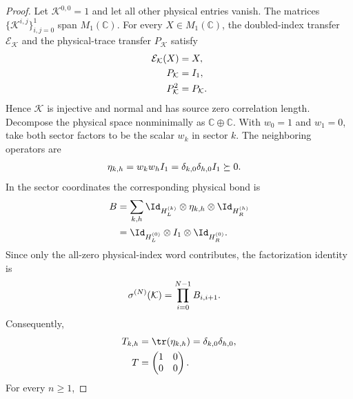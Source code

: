 \begin{proof}\leanok
    Let $\mathcal K^{0,0}=1$ and let all other physical entries vanish. The
    matrices $\{\mathcal K^{i,j}\}_{i,j=0}^1$ span $M_1(\mathbb C)$. For every
    $X\in M_1(\mathbb C)$, the doubled-index transfer $\mathcal E_{\mathcal K}$
    and the physical-trace transfer $P_{\mathcal K}$ satisfy
    \begin{align}
        \mathcal E_{\mathcal K}(X) & =X,
        \notag                                        \\
        P_{\mathcal K}             & =I_1,
        \notag                                        \\
        P_{\mathcal K}^2           & =P_{\mathcal K}.
        \notag
    \end{align}
    Hence $\mathcal K$ is injective and normal and has source zero correlation
    length. Decompose the physical space nonminimally as
    $\mathbb C\oplus\mathbb C$. With $w_0=1$ and $w_1=0$, take both sector
    factors to be the scalar $w_k$ in sector $k$. The neighboring operators
    are
    \begin{align}
        \eta_{k,h}
         & =w_kw_h I_1
        =\delta_{k,0}\delta_{h,0}I_1
        \succeq0.
        \notag
    \end{align}
    In the sector coordinates the corresponding physical bond is
    \begin{align}
        B
         & =\sum_{k,h}\Id_{H_L^{(k)}}\otimes\eta_{k,h}\otimes
        \Id_{H_R^{(h)}}
        \notag                                                \\
         & =\Id_{H_L^{(0)}}\otimes I_1\otimes\Id_{H_R^{(0)}}.
        \notag
    \end{align}
    Since only the all-zero physical-index word contributes, the
    factorization identity is
    \begin{align}
        \sigma^{(N)}(\mathcal K)
         & =\prod_{i=0}^{N-1}B_{i,i+1}.
        \notag
    \end{align}
    Consequently,
    \begin{align}
        T_{k,h}
          & =\tr(\eta_{k,h})
        =\delta_{k,0}\delta_{h,0},
        \notag                                     \\
        T & =\begin{pmatrix}1&0\\0&0\end{pmatrix}.
        \notag
    \end{align}
    For every $n\geq1$,

\end{proof}
